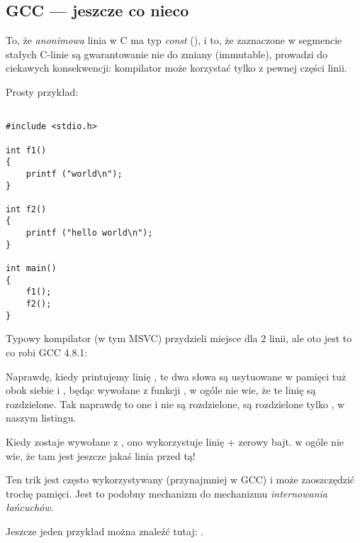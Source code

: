 \subsection{GCC --- jeszcze co nieco}
\label{use_parts_of_C_strings}

To, że \emph{anonimowa} linia w C ma typ \emph{const} (), 
i to, że zaznaczone w segmencie stałych C-linie są gwarantowanie nie do zmiany (immutable), 
prowadzi do ciekawych konsekwencji: kompilator może korzystać tylko z pewnej części linii.

Prosty przykład:

\begin{lstlisting}[style=customc]

#include <stdio.h>

int f1()
{
	printf ("world\n");
}

int f2()
{
	printf ("hello world\n");
}

int main()
{
	f1();
	f2();
}
\end{lstlisting}

Typowy kompilator \CCpp (w tym MSVC) przydzieli miejsce dla 2 linii, ale oto jest to co robi GCC 4.8.1:



Naprawdę, kiedy printujemy linię , 
te dwa słowa są usytuowane w pamięci tuż obok siebie i \puts, będąc wywołane z funkcji , w ogóle nie wie,
że te linię są rozdzielone. Tak naprawdę to one i nie są rozdzielone, są rozdzielone 
tylko , w naszym listingu.

Kiedy \puts zostaje wywołane z , ono wykorzystuje linię  + zerowy bajt. \puts w ogóle nie wie, że tam jest jeszcze jakaś linia przed tą!

Ten trik jest często wykorzystywany (przynajmniej w GCC) i może zaoszczędzić trochę pamięci.
Jest to podobny mechanizm do mechanizmu \emph{internowania łańcuchów}.

Jeszcze jeden przykład można znaleźć tutaj: .


